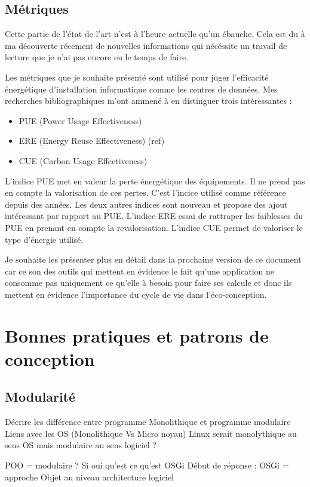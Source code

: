 \documentclass[a4paper, 11pt]{report}
\begin{document}
\subsection{Métriques}
Cette partie de l'état de l'art n'est à l'heure actuelle qu'un ébauche. Cela est du à ma découverte récement de nouvelles informations qui nécéssite un travail de lecture que je n'ai pas encore eu le temps de faire.

Les métriques que je souhaite présenté sont utilisé pour juger l'efficacité énergétique d'installation informatique comme les centres de données. Mes recherches bibliographiques m'ont ammené à en distinguer trois intéressantes :
\begin{itemize}
	\item PUE (Power Usage Effectiveness)
	\item ERE (Energy Reuse Effectiveness) (ref)
	\item CUE (Carbon Usage Effectiveness)
\end{itemize}

L’indice PUE met en valeur la perte énergétique des équipements. Il ne prend pas en compte la valorisation de ces pertes. C'est l'incice utilisé comme référence depuis des années. Les deux autres indices sont nouveau et propose des ajout intéressant par rapport au PUE. L’indice ERE essai de rattraper les faiblesses du PUE en prenant en compte la revalorisation. L’indice CUE permet de valoriser le type d’énergie utilisé.

Je souhaite les présenter plus en détail dans la prochaine version de ce document car ce son des outils qui mettent en évidence le fait qu'une application ne consomme pas uniquement ce qu'elle à besoin pour faire ses calcule  et donc ils mettent en évidence l'importance du cycle de vie dans l'éco-conception.

\section{Bonnes pratiques et patrons de conception}
\subsection{Modularité}
Décrire les différence entre programme Monolithique et programme modulaire
	Liens avec les OS (Monolithique Vs Micro noyau)
	Linux serait monolythique au sens OS mais modulaire au sens logiciel ?

POO = modulaire ?
	Si oui qu’est ce qu’est OSGi
	Début de réponse : OSGi = approche Objet au niveau architecture logiciel
\end{document}

